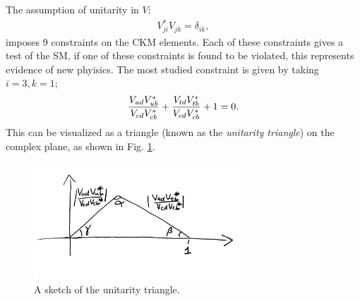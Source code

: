 
The assumption of unitarity in $V$;
\begin{align}
  V_{ji}^*V_{jk}=\delta_{ik},
  \label{eq:CKMunitarity}
\end{align}
imposes 9 constraints on the CKM elements. Each of these constraints gives a test of the SM, if one of these constraints is found to be violated, this represents evidence of new phyisics. The most studied constraint is given by taking $i=3,k=1$;
\begin{align}
  {V_{ud}V_{ub}^*\over V_{cd} V_{cb}^*} + {V_{td}V_{tb}^* \over V_{cd}V_{cb}^*} + 1 = 0.
\end{align}
This can be visualized as a triangle (known as the {\it{unitarity triangle}}) on the complex plane, as shown in Fig. \ref{fig:unitaritytriangle_sketch}.

\begin{figure}
  \vspace{-10pt}
  \begin{center}
    \includegraphics[width=0.7\textwidth]{images/unitaritytriangle_sketch.jpg}
  \end{center}
  \vspace{-40pt}
  \caption{A sketch of the unitarity triangle.}
  \label{fig:unitaritytriangle_sketch}
\end{figure}

